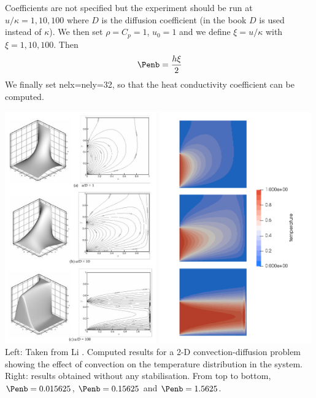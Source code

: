 Coefficients are not specified but the experiment should be run at $u/\kappa=1,10,100$ where 
$D$ is the diffusion coefficient (in the book $D$ is used instead of $\kappa$).
We then set $\rho=C_p=1$, $u_0=1$ and we define $\xi=u/\kappa$ with $\xi=1,10,100$. Then 
\[
\Penb = \frac{h\xi}{2} 
\]
We finally set nelx=nely=32, so that the heat conductivity coefficient can be computed.


\begin{center}
\includegraphics[height=10cm]{python_codes/fieldstone_65/results/exp3/libook}
\includegraphics[height=10cm]{python_codes/fieldstone_65/results/exp3/Tnostab}\\
{\captionfont Left: Taken from Li \cite{li06}. Computed results for a 2-D convection-diffusion 
problem showing the effect of convection on the temperature distribution in the system.
Right: results obtained without any stabilisation. From top to bottom, $\Penb=0.015625$, 
$\Penb=0.15625$ and $\Penb=1.5625$.}
\end{center}

